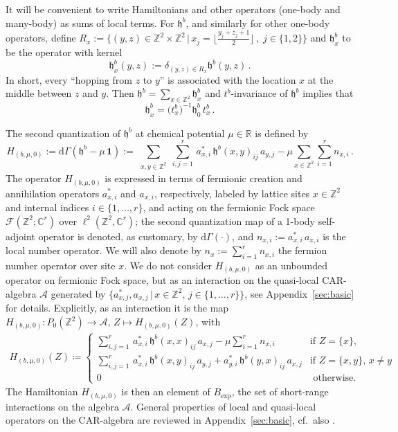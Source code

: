 \documentclass[a4paper]{article}
\newcommand{\fd}{r}
\newcommand{\Z}{\mathbb{Z}}
\newcommand{\C}{\mathbb{C}}
\newcommand{\mA}{\mathcal{A}}
\newcommand{\R}{\mathbb{R}}
\theoremstyle{plain}
\theoremstyle{definition}
\theoremstyle{remark}
\renewcommand{\(}{\left(}
\renewcommand{\)}{\right)}
\begin{document}
It will be convenient to write Hamiltonians and other operators (one-body  and many-body) as sums of local terms.
For $\mathfrak{h}^b$, and similarly for  other one-body operators, define $R_x :=\{(y,z)\in \Z^2\times\Z^2\,|\, x_j= \lfloor \frac{y_j+z_j+1}{2} \rfloor \,,\;j\in\{1,2\}\}$ and $\mathfrak{h}^b_x$ to be the operator with kernel
\[
\mathfrak{h}^b_x(y,z) := \delta_{(y,z)\in R_x} \mathfrak{h}^b(y,z)\,.
\]
In short, every ``hopping from $z$ to $y$'' is associated with the location $x$ at the middle between $z$ and $y$.
Then $\mathfrak{h}^b =\sum_{x\in\Z^2}\mathfrak{h}^b_x$ and  $t^b$-invariance of $\mathfrak{h}^b$ implies that 
\[
\mathfrak{h}^b_x = \big(t^b_x\big)^{-1} \mathfrak{h}^b_0\, t^b_x  \,.
\]

 
The second quantization of $\mathfrak{h}^{b}$ at chemical potential $\mu\in\R$ is defined by
\[
H_{(b,\mu,0)} := \mathrm{d}\Gamma(\mathfrak{h}^b - \mu \, \mathbf{1}) := \sum_{\substack{x,y\in\Z^2}} \sum_{i,j=1}^\fd \, a_{x,i}^* \,\mathfrak{h}^b(x,y)_{ij}\,a_{y,j} - \mu\sum_{x\in\Z^2 } \sum_{i=1}^\fd n_{x,i}\,.
\]
The operator $H_{(b,\mu,0)}$   is expressed in terms of fermionic creation and annihilation operators $a_{x,i}^*$ and $a_{x,i}$, respectively, labeled by lattice sites $x \in \Z^2$ and internal indices $i \in \{1,\ldots,\fd\}$, and acting on the fermionic Fock space $\mathcal{F}(\Z^2;\C^\fd)$ over $\ell^2(\Z^2,\C^\fd)$; the second quantization map of a 1-body  self-adjoint  operator is denoted, as customary, by $\mathrm{d}\Gamma(\cdot)$, and $n_{x,i} := a_{x,i}^* \, a_{x,i}$ is the local number operator. We will also denote by $n_x := \sum_{i=1}^{\fd} n_{x,i}$ the fermion number operator over site $x$. 
We do not consider $H_{(b,\mu,0)}$ as an unbounded operator on fermionic Fock space, but as an interaction   on the quasi-local CAR-algebra $\mA$  generated by $\{a_{x,j}^*, a_{x,j} \,|\, x \in \Z^2, \, j \in \{1, \dots , \fd\}\}$, see Appendix~\ref{sec:basic} for details. Explicitly, as an interaction  it is the map 
$H_{(b,\mu,0)}:P_0(\Z^2) \to \mA, \, Z\mapsto     H_{(b,\mu,0)}(Z) $, with
\begin{align*}
H_{(b,\mu,0)}(Z) \coloneq 
    \begin{cases}
    \sum_{i,j=1}^\fd \, a_{x,i}^* \,\mathfrak{h}^b(x,x)_{ij}\,a_{x,j}  - \mu \sum_{i=1}^\fd n_{x,i} & \text{if}\,\, Z=\{x\},  \\
        \sum_{i,j=1}^\fd \, a_{x,i}^* \,\mathfrak{h}^b(x,y)_{ij}\,a_{y,j} + a_{y,i}^* \,\mathfrak{h}^b(y,x)_{ij}\,a_{x,j} & \text{if}\,\, Z=\{x,y\}, \, x\not=y \\
       0 & \text{ otherwise.}
    \end{cases}
\end{align*}
The Hamiltonian  $H_{(b,\mu,0)}$ is then an element of $B_{\exp}$, the set of short-range interactions on the algebra  $\mA$.
General properties of local and quasi-local operators on the CAR-algebra are reviewed in Appendix~\ref{sec:basic}, cf.\ also \cite[Section 2.1]{WMMMT24}. 
 
\end{document}
